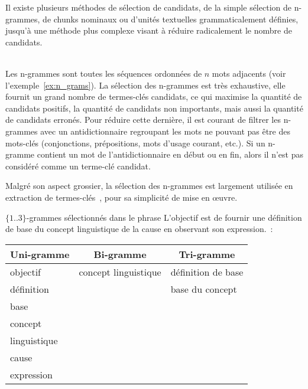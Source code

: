     Il existe plusieurs méthodes de sélection de candidats, de la simple
    sélection de n-grammes, de chunks nominaux ou d'unités textuelles
    grammaticalement définies, jusqu'à une méthode plus complexe visant à
    réduire radicalement le nombre de candidats.

    ~\\Les n-grammes sont
    toutes les séquences ordonnées de $n$ mots adjacents (voir
    l'exemple~\ref{ex:n_grams}). La sélection des n-grammes est très exhaustive,
    elle fournit un grand nombre de termes-clés candidats, ce qui maximise la
    quantité de candidats positifs, la quantité de candidats non importants,
    mais aussi la quantité de candidats erronés. Pour réduire cette dernière, il
    est courant de filtrer les n-grammes avec un
    antidictionnaire regroupant les mots ne pouvant pas être des
    mots-clés (conjonctions, prépositions, mots d'usage courant, etc.). Si un
    n-gramme contient un mot de l'antidictionnaire en début ou en fin, alors il
    n'est pas considéré comme un terme-clé candidat.
    
    Malgré son aspect grossier, la sélection des n-grammes est largement
    utilisée en extraction de
    termes-clés~\cite{witten1999kea,hulth2003keywordextraction,medelyan2009humancompetitivetagging},
    pour sa simplicité de mise en \oe{}uvre.

    \begin{example}\label{ex:n_grams}
      $\{1..3\}$-grammes sélectionnés dans le phrase \og{}L'objectif est de
      fournir une définition de base du concept linguistique de la cause en
      observant son expression.\fg{}~:
      \begin{center}
        \begin{tabular}{l|l|l}
          \toprule
          \multicolumn{1}{c|}{\textbf{Uni-gramme}} & \multicolumn{1}{c|}{\textbf{Bi-gramme}} & \multicolumn{1}{c}{\textbf{Tri-gramme}}\\
          \hline
          \og{}objectif\fg{} & \og{}concept linguistique\fg{} & \og{}définition de base\fg{}\\
          \og{}définition\fg{} & & \og{}base du concept\fg{}\\
          \og{}base\fg{} & &\\
          \og{}concept\fg{} & &\\
          \og{}linguistique\fg{} & &\\
          \og{}cause\fg{} & &\\
          \og{}expression\fg{} & &\\
          \bottomrule
        \end{tabular}
      \end{center}\vspace{.25em}
    \end{example}

